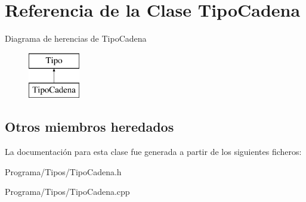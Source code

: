 \hypertarget{class_tipo_cadena}{\section{Referencia de la Clase Tipo\-Cadena}
\label{class_tipo_cadena}
}
Diagrama de herencias de Tipo\-Cadena\begin{figure}[H]
\begin{center}
\leavevmode
\includegraphics[height=2.000000cm]{class_tipo_cadena}
\end{center}
\end{figure}
\subsection*{Otros miembros heredados}


La documentación para esta clase fue generada a partir de los siguientes ficheros\-:\begin{DoxyCompactItemize}
\item 
Programa/\-Tipos/Tipo\-Cadena.\-h\item 
Programa/\-Tipos/Tipo\-Cadena.\-cpp\end{DoxyCompactItemize}
